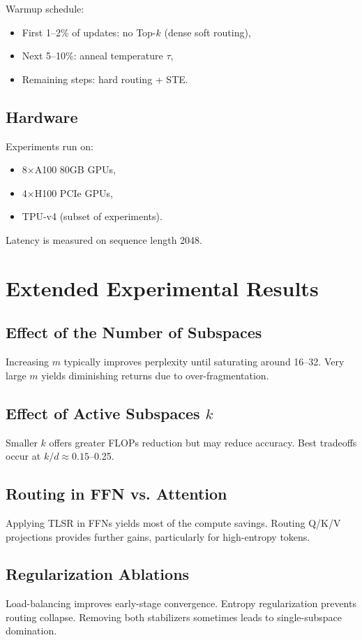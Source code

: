 \documentclass{article}
\theoremstyle{plain}
\theoremstyle{definition}
\theoremstyle{remark}
\begin{document}
Warmup schedule:
\begin{itemize}
\item First 1--2\% of updates: no Top-$k$ (dense soft routing),
\item Next 5--10\%: anneal temperature $\tau$,
\item Remaining steps: hard routing + STE.
\end{itemize}

\subsection{Hardware}
Experiments run on:
\begin{itemize}
\item 8$\times$A100 80GB GPUs,
\item 4$\times$H100 PCIe GPUs,
\item TPU-v4 (subset of experiments).
\end{itemize}

Latency is measured on sequence length 2048.

\section{Extended Experimental Results}

\subsection{Effect of the Number of Subspaces}
Increasing $m$ typically improves perplexity until saturating around 16–32.
Very large $m$ yields diminishing returns due to over-fragmentation.

\subsection{Effect of Active Subspaces $k$}
Smaller $k$ offers greater FLOPs reduction but may reduce accuracy.
Best tradeoffs occur at $k/d \approx 0.15$–0.25.

\subsection{Routing in FFN vs. Attention}
Applying TLSR in FFNs yields most of the compute savings.
Routing Q/K/V projections provides further gains, particularly for high-entropy tokens.

\subsection{Regularization Ablations}
Load-balancing improves early-stage convergence.
Entropy regularization prevents routing collapse.
Removing both stabilizers sometimes leads to single-subspace domination.
\end{document}
